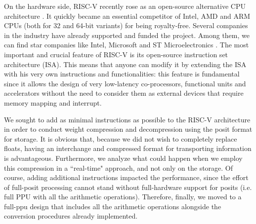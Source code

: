 On the hardware side, RISC-V recently rose as an open-source alternative CPU architecture \cite{riscvisa,waterman2011risc,asanovic2014instruction}. It quickly became an essential competitor of Intel, AMD and ARM CPUs (both for 32 and 64-bit variants) for being royalty-free. Several companies in the industry have already supported and funded the project. Among them, we can find star companies like Intel, Microsoft and ST Microelectronics \cite{riscvabout}. The most important and crucial feature of RISC-V is its open-source instruction set architecture (ISA).
This means that anyone can modify it by extending the ISA with his very own instructions and functionalities: this feature is fundamental since it allows the design of very low-latency co-processors, functional units and accelerators without the need to consider them as external devices that require memory mapping and interrupt.

We sought to add as minimal instructions as possible to the RISC-V architecture in order to conduct weight compression and decompression using the posit format for storage. It is obvious that, because we did not wish to completely replace floats, having an interchange and compressed format for transporting information is advantageous. Furthermore, we analyze what could happen when we employ this compression in a ``real-time" approach, and not only on the storage. Of course, adding additional instructions impacted the performance, since the effort of full-posit processing cannot stand without full-hardware support for posits (i.e. full PPU with all the arithmetic operations). Therefore, finally, we moved to a full-ppu design that includes all the arithmetic operations alongside the conversion procedures already implemented.

